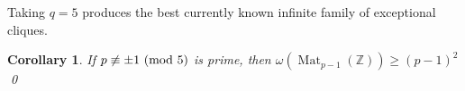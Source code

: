 \documentclass{amsart}
\theoremstyle{plain}
\newtheorem{corollary}[theorem]{Corollary}
\theoremstyle{definition}
\newtheorem{remark}[theorem]{Remark}
\DeclareMathOperator{\Mat}{Mat}
\newcommand{\Z}{\ensuremath{\mathbb{Z}}}
\newcommand{\inote}[1]{\textbf{\color{red}Ignacio: #1}}
\begin{document}
Taking $q=5$ produces the best currently known infinite family of exceptional cliques.

\begin{corollary}\label{cor:q=5}
	If $p\not\equiv \pm1\ (\textup{mod }5)$ is prime, then \(\omega(\Mat_{p-1}(\Z))\geq(p-1)^2\) \qed
\end{corollary}

\end{document}
